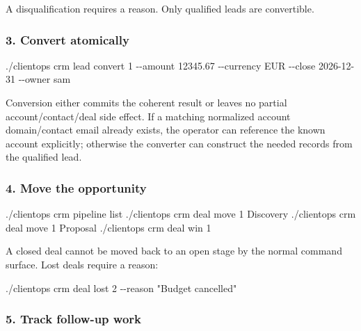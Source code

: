 \documentclass[
]{article}
\newenvironment{Shaded}{}{}
\newcommand{\AttributeTok}[1]{\textcolor[rgb]{0.49,0.56,0.16}{#1}}
\newcommand{\ExtensionTok}[1]{#1}
\newcommand{\NormalTok}[1]{#1}
\newcommand{\StringTok}[1]{\textcolor[rgb]{0.25,0.44,0.63}{#1}}
\begin{document}
A disqualification requires a reason. Only qualified leads are
convertible.

\subsubsection{3. Convert atomically}\label{3-convert-atomically}

\begin{Shaded}
\begin{Highlighting}[]
\ExtensionTok{./clientops}\NormalTok{ crm lead convert 1 }\AttributeTok{{-}{-}amount}\NormalTok{ 12345.67 }\AttributeTok{{-}{-}currency}\NormalTok{ EUR }\AttributeTok{{-}{-}close}\NormalTok{ 2026{-}12{-}31 }\AttributeTok{{-}{-}owner}\NormalTok{ sam}
\end{Highlighting}
\end{Shaded}

Conversion either commits the coherent result or leaves no partial
account/contact/deal side effect. If a matching normalized account
domain/contact email already exists, the operator can reference the
known account explicitly; otherwise the converter can construct the
needed records from the qualified lead.

\subsubsection{4. Move the opportunity}\label{4-move-the-opportunity}

\begin{Shaded}
\begin{Highlighting}[]
\ExtensionTok{./clientops}\NormalTok{ crm pipeline list}
\ExtensionTok{./clientops}\NormalTok{ crm deal move 1 Discovery}
\ExtensionTok{./clientops}\NormalTok{ crm deal move 1 Proposal}
\ExtensionTok{./clientops}\NormalTok{ crm deal win 1}
\end{Highlighting}
\end{Shaded}

A closed deal cannot be moved back to an open stage by the normal
command surface. Lost deals require a reason:

\begin{Shaded}
\begin{Highlighting}[]
\ExtensionTok{./clientops}\NormalTok{ crm deal lost 2 }\AttributeTok{{-}{-}reason} \StringTok{"Budget cancelled"}
\end{Highlighting}
\end{Shaded}

\subsubsection{5. Track follow-up work}\label{5-track-follow-up-work}
\end{document}
